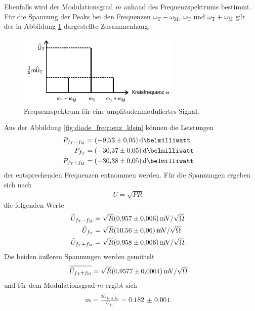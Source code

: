 Ebenfalls wird der Modulationsgrad $m$ anhand des Frequenzspektrums bestimmt.
Für die Spannung der Peaks bei den Frequenzen $\omega_{\text{T}}-\omega_{\text{M}}$, $\omega_{\text{T}}$  und $\omega_{\text{T}}+\omega_{\text{M}}$
gilt der in Abbildung \ref{fig:2} dargestellte
Zusammenhang.

\begin{figure}
  \centering
  \includegraphics[width=0.7\textwidth]{figures/frequenzspektrum.PNG}
  \caption{Frequenzspektrum für eine amplitudenmoduliertes Signal.}
  \label{fig:2}
\end{figure}

Aus der Abbildung \ref{fig:diode_frequenz_klein} können die Leistungen
\begin{align}
P_{f_{\text{T}}-f_{\text{M}}}&=\SI{-9.53(5)}{\deci\belmilliwatt} \notag \\
P_{f_{\text{T}}}&=\SI{-30.37(5)}{\deci\belmilliwatt}\\
P_{f_{\text{T}}+f_{\text{M}}}&=\SI{-30.38(5)}{\deci\belmilliwatt}\notag
\end{align}
der entsprechenden Frequenzen entnommen werden.
Für die Spannungen ergeben sich nach
\begin{align}
  U= \sqrt{P R}
\end{align}
die folgenden Werte
\begin{align}
   \hat{U}_{f_{\text{T}}-f_{\text{M}}}&=\sqrt{R}\SI{0.957(6)}{\milli\volt\per\sqrt{\ohm}}\notag\\
  \hat{U}_{f_{\text{T}}}&=\sqrt{R}\SI{10.56(6)}{\milli\volt\per\sqrt{\ohm}}\\
  \hat{U}_{f_{\text{T}}+f_{\text{M}}}&=\sqrt{R}\SI{0.958(6)}{\milli\volt\per\sqrt{\ohm}}.\notag
\end{align}
Die beiden äußeren Spannungen werden gemittelt
\begin{align}
  \overline{\hat{U}_{f_{\text{T}}\pm f_{\text{M}}}} = \sqrt{R}\SI{0.9577(4)}{\milli\volt\per\sqrt{\ohm}}
\end{align}
und für
dem Modulationsgrad $m$ ergibt sich
\begin{align}
m=\frac{2\overline{\hat{U}_{f_{\text{T}}\pm f_{\text{M}}}}}{U_{f_{\text{T}}}} = \num{0.182(1)}. \label{eqn:m_leistung}
\end{align}

